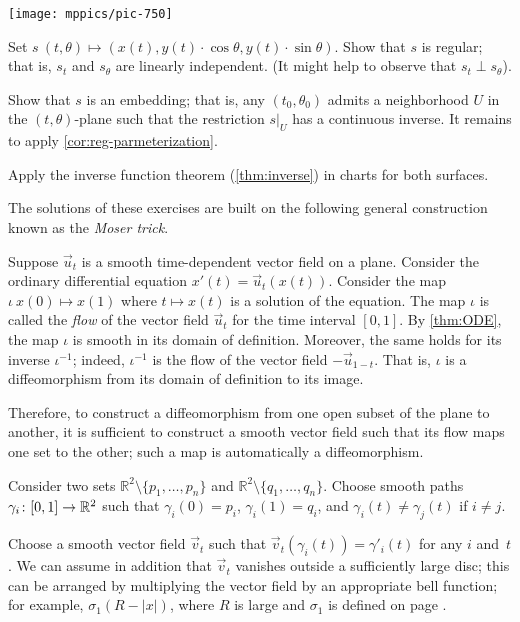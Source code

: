 \begin{multicols}{2}
\begin{Figure}
\vskip-0mm
\centering
\texttt{[image: mppics/pic-750]}
\vskip0mm
\end{Figure}

Set
$s\:(t,\theta)\mapsto (x(t), y(t)\cdot\cos\theta,y(t)\cdot\sin\theta)$.
Show that $s$ is regular; that is, $s_t$ and $s_\theta$ are linearly independent.
(It might help to observe that $s_t\perp s_\theta$).

Show that $s$ is an embedding;
that is, any $(t_0,\theta_0)$ admits a neighborhood $U$ in the $(t,\theta)$-plane such that the restriction $s|_U$ has a continuous inverse.
It remains to apply \ref{cor:reg-parmeterization}.

 Apply the inverse function theorem (\ref{thm:inverse}) in charts for both surfaces. 

The solutions of these exercises are built on the following general construction known as the \emph{Moser trick}.

Suppose $\vec u_t$ is a smooth time-dependent vector field on a plane.
Consider the ordinary differential equation $x'(t)=\vec u_t(x(t))$.
Consider the map $\iota\:x(0)\mapsto x(1)$ where $t\mapsto x(t)$ is a solution of the equation.
The map $\iota$ is called the \emph{flow} of the vector field $\vec u_t$ for the time interval $[0,1]$.
By \ref{thm:ODE}, the map $\iota$ is smooth in its domain of definition.
Moreover, the same holds for its inverse $\iota^{-1}$;
indeed, $\iota^{-1}$ is the flow of the vector field $-\vec u_{1-t}$.
That is, $\iota$ is a diffeomorphism from its domain of definition to its image. 


Therefore, to construct a diffeomorphism from one open subset of the plane to another, it is sufficient to construct a smooth vector field such that its flow maps one set to the other;
such a map is automatically a diffeomorphism.


Consider two sets $\mathbb{R}^2\setminus\{p_1,\dots,p_n\}$ and $\mathbb{R}^2\setminus\{q_1,\dots,q_n\}$.
Choose smooth paths $\gamma_i\:[0,1]\z\to \mathbb{R}^2$ such that $\gamma_i(0)=p_i$,
$\gamma_i(1)=q_i$, and $\gamma_i(t)\ne \gamma_j(t)$ if $i\ne j$.

Choose a smooth vector field $\vec v_t$ such that $\vec v_t(\gamma_i(t))=\gamma'_i(t)$ for any $i$ and~$t$.
We can assume in addition that $\vec v_t$ vanishes outside a sufficiently large disc; this can be arranged by multiplying the vector field by an appropriate bell function;
for example, $\sigma_1(R-|x|)$, where $R$ is large and $\sigma_1$ is defined on page \pageref{page:sigma-function}.


\end{multicols}
